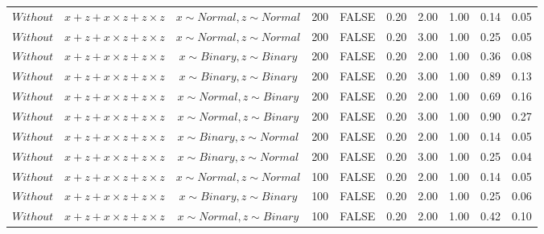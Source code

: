 \begin{longtable}{lccccccccc}
  $Without$ & $\textit{x} + \textit{z} + \textit{x} \times \textit{z} + \textit{z} \times \textit{z}$ & $\textit{x} \sim Normal , \textit{z} \sim Normal$ & 200 & FALSE & 0.20 & 2.00 & 1.00 & 0.14 & 0.05 \\ 
  $Without$ & $\textit{x} + \textit{z} + \textit{x} \times \textit{z} + \textit{z} \times \textit{z}$ & $\textit{x} \sim Normal , \textit{z} \sim Normal$ & 200 & FALSE & 0.20 & 3.00 & 1.00 & 0.25 & 0.05 \\ 
  $Without$ & $\textit{x} + \textit{z} + \textit{x} \times \textit{z} + \textit{z} \times \textit{z}$ & $\textit{x} \sim Binary, \textit{z} \sim Binary$ & 200 & FALSE & 0.20 & 2.00 & 1.00 & 0.36 & 0.08 \\ 
  $Without$ & $\textit{x} + \textit{z} + \textit{x} \times \textit{z} + \textit{z} \times \textit{z}$ & $\textit{x} \sim Binary, \textit{z} \sim Binary$ & 200 & FALSE & 0.20 & 3.00 & 1.00 & 0.89 & 0.13 \\ 
  $Without$ & $\textit{x} + \textit{z} + \textit{x} \times \textit{z} + \textit{z} \times \textit{z}$ & $\textit{x} \sim Normal, \textit{z} \sim Binary$ & 200 & FALSE & 0.20 & 2.00 & 1.00 & 0.69 & 0.16 \\ 
  $Without$ & $\textit{x} + \textit{z} + \textit{x} \times \textit{z} + \textit{z} \times \textit{z}$ & $\textit{x} \sim Normal, \textit{z} \sim Binary$ & 200 & FALSE & 0.20 & 3.00 & 1.00 & 0.90 & 0.27 \\ 
  $Without$ & $\textit{x} + \textit{z} + \textit{x} \times \textit{z} + \textit{z} \times \textit{z}$ & $\textit{x} \sim Binary, \textit{z} \sim Normal$ & 200 & FALSE & 0.20 & 2.00 & 1.00 & 0.14 & 0.05 \\ 
  $Without$ & $\textit{x} + \textit{z} + \textit{x} \times \textit{z} + \textit{z} \times \textit{z}$ & $\textit{x} \sim Binary, \textit{z} \sim Normal$ & 200 & FALSE & 0.20 & 3.00 & 1.00 & 0.25 & 0.04 \\ 
  $Without$ & $\textit{x} + \textit{z} + \textit{x} \times \textit{z} + \textit{z} \times \textit{z}$ & $\textit{x} \sim Normal , \textit{z} \sim Normal$ & 100 & FALSE & 0.20 & 2.00 & 1.00 & 0.14 & 0.05 \\ 
  $Without$ & $\textit{x} + \textit{z} + \textit{x} \times \textit{z} + \textit{z} \times \textit{z}$ & $\textit{x} \sim Binary, \textit{z} \sim Binary$ & 100 & FALSE & 0.20 & 2.00 & 1.00 & 0.25 & 0.06 \\ 
  $Without$ & $\textit{x} + \textit{z} + \textit{x} \times \textit{z} + \textit{z} \times \textit{z}$ & $\textit{x} \sim Normal, \textit{z} \sim Binary$ & 100 & FALSE & 0.20 & 2.00 & 1.00 & 0.42 & 0.10 \\ 

\end{longtable}
